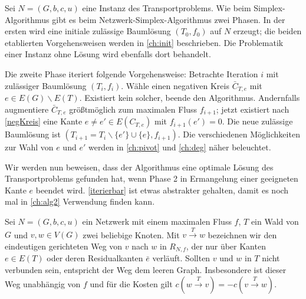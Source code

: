 Sei $N=(G,b,c,u)$ eine Instanz des Transportproblems. Wie beim Simplex-Algorithmus gibt es beim Netzwerk-Simplex-Algorithmus zwei Phasen. In der ersten wird eine initiale zulässige Baumlösung $(T_0,f_0)$ auf $N$ erzeugt; die beiden etablierten Vorgehensweisen werden in \cref{ch:init} beschrieben. Die Problematik einer Instanz ohne Lösung wird ebenfalls dort behandelt.

Die zweite Phase iteriert folgende Vorgehensweise: Betrachte Iteration $i$ mit zulässiger Baumlösung $(T_i,f_i)$. Wähle einen negativen Kreis $\bar{C}_{T,e}$ mit $e\in E(G)\backslash E(T)$. Existiert kein solcher, beende den Algorithmus. Andernfalls augmentiere $\bar{C}_{T,e}$ größtmöglich zum maximalen Fluss $f_{i+1}$; jetzt existiert nach \cref{negKreis} eine Kante $e\neq e'\in E(C_{T,e})$ mit $f_{i+1}(e')=0$. Die neue zulässige Baumlösung ist $(T_{i+1}=T_i\backslash\{e'\}\cup\{e\},f_{i+1})$. Die verschiedenen Möglichkeiten zur Wahl von $e$ und $e'$ werden in \cref{ch:pivot} und \cref{ch:deg} näher beleuchtet.

Wir werden nun beweisen, dass der Algorithmus eine optimale Lösung des Transportproblems gefunden hat, wenn Phase 2 in Ermangelung einer geeigneten Kante $e$ beendet wird. \cref{iterierbar} ist etwas abstrakter gehalten, damit es noch mal in \cref{ch:alg2} Verwendung finden kann.

\begin{nota}Sei $N=(G,b,c,u)$ ein Netzwerk mit einem maximalen Fluss $f$, $T$ ein Wald von $G$ und $v,w\in V(G)$ zwei beliebige Knoten. Mit $v\xrightarrow{T}w$ bezeichnen wir den eindeutigen gerichteten Weg von $v$ nach $w$ in $R_{N,f}$, der nur über Kanten $e\in E(T)$ oder deren Residualkanten $\bar{e}$ verläuft. Sollten $v$ und $w$ in $T$ nicht verbunden sein, entspricht der Weg dem leeren Graph. Insbesondere ist dieser Weg unabhängig von $f$ und für die Kosten gilt $c(w\xrightarrow{T}v) = -c(v\xrightarrow{T}w)$.\end{nota}


